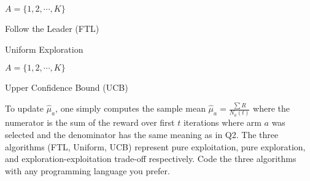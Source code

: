 \documentclass{article}
\begin{document}
\begin{algorithm}[H]
\SetAlgoLined
$A=\{1,2, \cdots, K \}$

\caption{Follow the Leader (FTL)}
\end{algorithm}
\vspace{3mm}

\begin{algorithm}[H]
\SetAlgoLined
{}

\caption{Uniform Exploration}
\end{algorithm}
\vspace{3mm}

\begin{algorithm}[H]
\SetAlgoLined
$A=\{1,2, \cdots, K \}$

\caption{Upper Confidence Bound (UCB)}
\end{algorithm}
\vspace{3mm}

To update $\hat{\mu}_a$, one simply computes the sample mean $\hat{\mu}_a = \frac{\sum R}{N_a(t)}$ where the numerator is the sum of the reward over first $t$ iterations where arm $a$ was selected and the denominator has the same meaning as in Q2. The three algorithms (FTL, Uniform, UCB) represent pure exploitation, pure exploration, and exploration-exploitation trade-off respectively. Code the three algorithms with any programming language you prefer.
\end{document}
